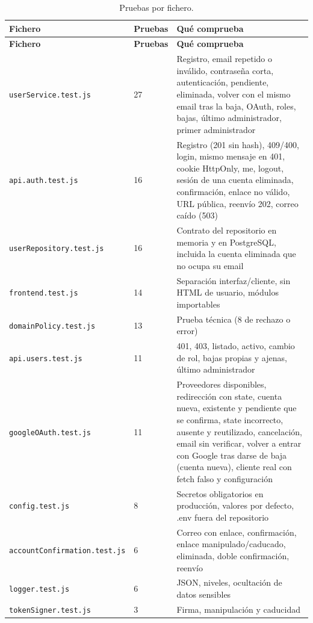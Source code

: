 \begin{longtable}{@{}L{5.0cm} R{1.2cm} L{8.0cm}@{}}
\caption{Pruebas por fichero.}\label{tab:pruebas-por-fichero}\\
\toprule
\textbf{Fichero} & \textbf{Pruebas} & \textbf{Qué comprueba} \\ \midrule \endfirsthead
\toprule
\textbf{Fichero} & \textbf{Pruebas} & \textbf{Qué comprueba} \\ \midrule \endhead
\texttt{userService\allowbreak.test.js} & 27 & Registro, email repetido o inválido, contraseña corta, autenticación, pendiente, eliminada, volver con el mismo email tras la baja, OAuth, roles, bajas, último administrador, primer administrador \\
\texttt{api.auth\allowbreak.test.js} & 16 & Registro (201 sin hash), 409/400, login, mismo mensaje en 401, cookie HttpOnly, me, logout, sesión de una cuenta eliminada, confirmación, enlace no válido, URL pública, reenvío 202, correo caído (503) \\
\texttt{userRepository\allowbreak.test.js} & 16 & Contrato del repositorio en memoria y en PostgreSQL, incluida la cuenta eliminada que no ocupa su email \\
\texttt{frontend\allowbreak.test.js} & 14 & Separación interfaz/cliente, sin HTML de usuario, módulos importables \\
\texttt{domainPolicy\allowbreak.test.js} & 13 & Prueba técnica (8 de rechazo o error) \\
\texttt{api.users\allowbreak.test.js} & 11 & 401, 403, listado, activo, cambio de rol, bajas propias y ajenas, último administrador \\
\texttt{googleOAuth\allowbreak.test.js} & 11 & Proveedores disponibles, redirección con state, cuenta nueva, existente y pendiente que se confirma, state incorrecto, ausente y reutilizado, cancelación, email sin verificar, volver a entrar con Google tras darse de baja (cuenta nueva), cliente real con fetch falso y configuración \\
\texttt{config\allowbreak.test.js} & 8 & Secretos obligatorios en producción, valores por defecto, .env fuera del repositorio \\
\texttt{accountConfirmation\allowbreak.test.js} & 6 & Correo con enlace, confirmación, enlace manipulado/caducado, eliminada, doble confirmación, reenvío \\
\texttt{logger\allowbreak.test.js} & 6 & JSON, niveles, ocultación de datos sensibles \\
\texttt{tokenSigner\allowbreak.test.js} & 3 & Firma, manipulación y caducidad \\

\end{longtable}
